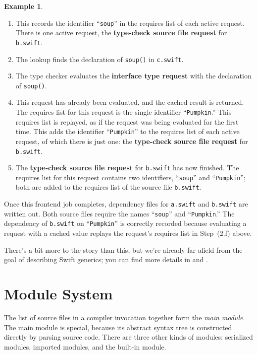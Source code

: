 \documentclass[a4paper,headsepline,bibliography=totoc,toc=flat,fleqn,twoside=semi]{scrbook}
\theoremstyle{definition}
\theoremstyle{definition}
\newtheorem{example}{Example}[chapter]
\theoremstyle{definition}
\begin{document}
\begin{example}
\begin{enumerate}
\begin{enumerate}
\item This records the identifier ``\texttt{soup}'' in the requires list of each active request. There is one active request, the \textbf{type-check source file request} for \texttt{b.swift}.
\item The lookup finds the declaration of \texttt{soup()} in \texttt{c.swift}.
\item The type checker evaluates the \textbf{interface type request} with the declaration of \texttt{soup()}.
\item This request has already been evaluated, and the cached result is returned. The requires list for this request is the single identifier ``\texttt{Pumpkin}.'' This requires list is replayed, as if the request was being evaluated for the first time. This adds the identifier ``\texttt{Pumpkin}'' to the requires list of each active request, of which there is just one: the \textbf{type-check source file request} for \texttt{b.swift}.
\item The \textbf{type-check source file request} for \texttt{b.swift} has now finished. The requires list for this request contains two identifiers, ``\texttt{soup}'' and ``\texttt{Pumpkin}''; both are added to the requires list of the source file \texttt{b.swift}.
\end{enumerate}
\end{enumerate}
Once this frontend job completes, dependency files for \texttt{a.swift} and \texttt{b.swift} are written out. Both source files require the names ``\texttt{soup}'' and ``\texttt{Pumpkin}.'' The dependency of \texttt{b.swift} on ``\texttt{Pumpkin}'' is correctly recorded because evaluating a request with a cached value replays the request's requires list in Step~(2.f) above.
\end{example}

There's a bit more to the story than this, but we're already far afield from the goal of describing Swift generics; you can find more details in \cite{reqeval} and \cite{incremental}.

\section{Module System}\label{module system}

The list of source files in a compiler invocation together form the \emph{main module}. The main module is special, because its abstract syntax tree is constructed directly by parsing source code. There are three other kinds of modules: serialized modules, imported modules, and the built-in module.
\end{document}
